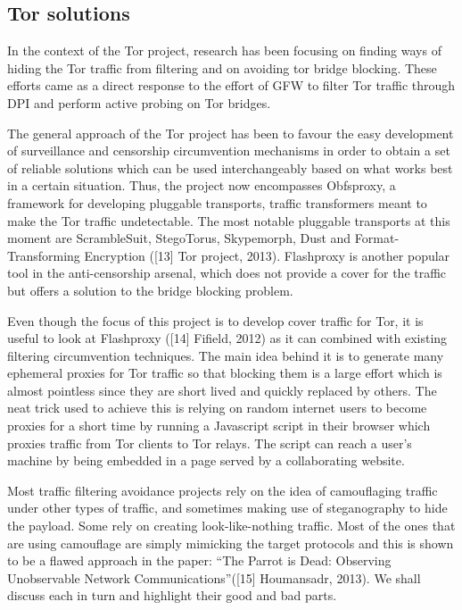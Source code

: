\documentclass[11pt]{book} %
\begin{document}
\subsection{Tor solutions}

In the context of the Tor project, research has been focusing on finding ways of hiding the Tor traffic from filtering and on avoiding tor bridge blocking. These efforts came as a direct response to the effort of GFW to filter Tor traffic through DPI and perform active probing on Tor bridges.

The general approach of the Tor project has been to favour the easy development of surveillance and censorship circumvention mechanisms in order to obtain a set of reliable solutions which can be used interchangeably based on what works best in a certain situation. Thus, the project now encompasses Obfsproxy, a framework for developing pluggable transports, traffic transformers meant to make the Tor traffic undetectable. The most notable pluggable transports at this moment are ScrambleSuit, StegoTorus, Skypemorph, Dust and Format-Transforming Encryption ([13] Tor project, 2013). Flashproxy is another popular tool in the anti-censorship arsenal, which does not provide a cover for the traffic but offers a solution to the bridge blocking problem.


Even though the focus of this project is to develop cover traffic for Tor, it is useful to look at Flashproxy ([14] Fifield, 2012) as it can combined with existing filtering circumvention techniques. The main idea behind it is to generate many ephemeral proxies for Tor traffic so that blocking them is a large effort which is almost pointless since they are short lived and quickly replaced by others. The neat trick used to achieve this is relying on random internet users to become proxies for a short time by running a Javascript script in their browser which proxies traffic from Tor clients to Tor relays. The script can reach a user’s machine by being embedded in a page served by a collaborating website. 


Most traffic filtering avoidance projects rely on the idea of camouflaging traffic under other types of traffic, and sometimes making use of steganography to hide the payload. Some rely on creating look-like-nothing traffic. Most of the ones that are using camouflage are simply mimicking the target protocols and this is shown to be a flawed approach in the paper: “The Parrot is Dead: Observing Unobservable Network Communications”([15] Houmansadr, 2013). We shall discuss each in turn and highlight their good and bad parts.
\end{document}

